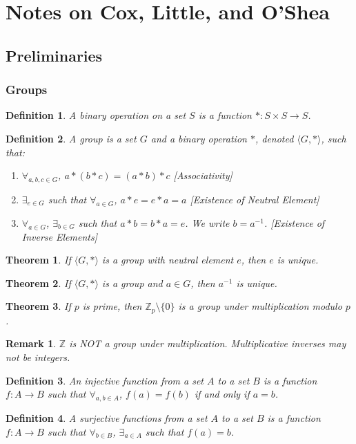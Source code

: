 \documentclass[oneside]{book}
\theoremstyle{mystyle}
\newtheorem{theorem}{Theorem}[section]
\newtheorem{definition}{Definition}[section]
\newtheorem{remark}{Remark}[section]
\begin{document}
\section{Notes on Cox, Little, and O'Shea}
\subsection{Preliminaries}
\subsubsection{Groups}
\begin{definition}
A binary operation on a set $S$ is a function $*:S\times S \rightarrow S$.
\end{definition}
\begin{definition}
A group is a set $G$ and a binary operation $*$, denoted $\langle G,*\rangle$, such that:
\begin{enumerate}
    \item $\forall_{a,b,c\in G}$, $a*(b*c) = (a*b)*c$ \hfill [Associativity]
    \item $\exists_{e\in G}$ such that $\forall_{a\in G}$, $a*e=e*a = a$ \hfill [Existence of Neutral Element]
    \item $\forall_{a\in G}$, $\exists_{b\in G}$ such that $a*b = b*a = e$. We write $b=a^{-1}$. \hfill [Existence of Inverse Elements]
\end{enumerate}
\end{definition}
\begin{theorem}
If $\langle G, *\rangle$ is a group with neutral element $e$, then $e$ is unique.
\end{theorem}
\begin{theorem}
If $\langle G,*\rangle$ is a group and $a\in G$, then $a^{-1}$ is unique.
\end{theorem}
\begin{theorem}
If $p$ is prime, then $\mathbb{Z}_p\setminus \{0\}$ is a group under multiplication modulo $p$.
\end{theorem}
\begin{remark}
$\mathbb{Z}$ is NOT a group under multiplication. Multiplicative inverses may not be integers.
\end{remark}
\begin{definition}
An injective function from a set $A$ to a set $B$ is a function $f:A\rightarrow B$ such that $\forall_{a,b\in A}$, $f(a) = f(b)$ if and only if $a=b$.
\end{definition}
\begin{definition}
A surjective functions from a set $A$ to a set $B$ is a function $f:A\rightarrow B$ such that $\forall_{b\in B}$, $\exists_{a\in A}$ such that $f(a) = b$.
\end{definition}
\end{document}
